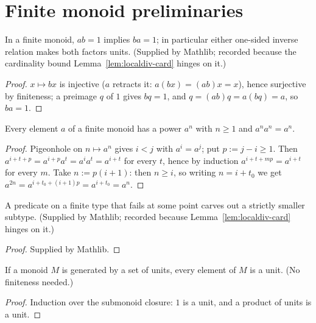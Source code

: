 \chapter{Finite monoid preliminaries}\label{ch:finitemonoid}

\begin{lemma}\label{lem:finite-unit}
  \leanok
  In a finite monoid, $ab = 1$ implies $ba = 1$; in particular either
  one-sided inverse relation makes both factors units. (Supplied by
  Mathlib; recorded because the cardinality bound
  Lemma~\ref{lem:localdiv-card} hinges on it.)
\end{lemma}
\begin{proof}
  \leanok
  $x \mapsto bx$ is injective ($a$ retracts it: $a(bx) = (ab)x = x$),
  hence surjective by finiteness; a preimage $q$ of $1$ gives $bq = 1$,
  and $q = (ab)q = a(bq) = a$, so $ba = 1$.
\end{proof}

\begin{lemma}\label{lem:idem-pow}
  \leanok
  Every element $a$ of a finite monoid has a power $a^n$ with
  $n \ge 1$ and $a^n a^n = a^n$.
\end{lemma}
\begin{proof}
  \leanok
  Pigeonhole on $n \mapsto a^n$ gives $i < j$ with $a^i = a^j$; put
  $p := j - i \ge 1$. Then $a^{i+t+p} = a^{i+p} a^t = a^i a^t =
  a^{i+t}$ for every $t$, hence by induction
  $a^{i+t+mp} = a^{i+t}$ for every $m$. Take $n := p(i+1)$: then
  $n \ge i$, so writing $n = i + t_0$ we get
  $a^{2n} = a^{i + t_0 + (i+1)p} = a^{i+t_0} = a^n$.
\end{proof}

\begin{lemma}\label{lem:card-subtype-lt}
  \leanok
  A predicate on a finite type that fails at some point carves out a
  strictly smaller subtype. (Supplied by Mathlib; recorded because
  Lemma~\ref{lem:localdiv-card} hinges on it.)
\end{lemma}
\begin{proof}
  \leanok
  Supplied by Mathlib.
\end{proof}

\begin{lemma}\label{lem:units-generated}
  \leanok
  If a monoid $M$ is generated by a set of units, every element of $M$
  is a unit. (No finiteness needed.)
\end{lemma}
\begin{proof}
  \leanok
  Induction over the submonoid closure: $1$ is a unit, and a product
  of units is a unit.
\end{proof}

